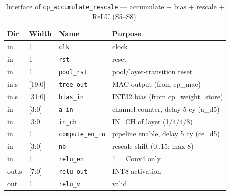 \begin{table}[t]
\centering
\caption{Interface of \texttt{cp\_accumulate\_rescale} — accumulate + bias + rescale + ReLU (S5--S8).}
\label{tab:if-cp-accres}
\small
\setlength{\tabcolsep}{4pt}
\renewcommand{\arraystretch}{1.1}
\begin{tabular}{@{}llll@{}}
\toprule
\textbf{Dir} & \textbf{Width} & \textbf{Name} & \textbf{Purpose} \\
\midrule
in    & 1      & \texttt{clk}            & clock \\
in    & 1      & \texttt{rst}            & reset \\
in    & 1      & \texttt{pool\_rst}      & pool/layer-transition reset \\
in.s  & [19:0] & \texttt{tree\_out}      & MAC output (from cp\_mac) \\
in.s  & [31:0] & \texttt{bias\_in}       & INT32 bias (from cp\_weight\_store) \\
in    & [3:0]  & \texttt{a\_in}          & channel counter, delay 5 cy (a\_d5) \\
in    & [3:0]  & \texttt{in\_ch}         & IN\_CH of layer (1/4/4/8) \\
in    & 1      & \texttt{compute\_en\_in}& pipeline enable, delay 5 cy (ce\_d5) \\
in    & [3:0]  & \texttt{nb}             & rescale shift (0..15; max 8) \\
in    & 1      & \texttt{relu\_en}       & 1 = Conv4 only \\
out.s & [7:0]  & \texttt{relu\_out}      & INT8 activation \\
out   & 1      & \texttt{relu\_v}        & valid \\
\bottomrule
\end{tabular}
\end{table}


